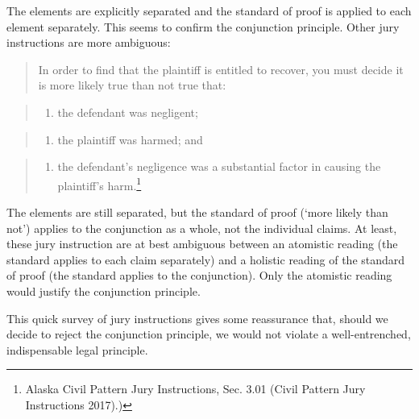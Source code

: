 \documentclass[
  10pt,
  dvipsnames,enabledeprecatedfontcommands]{scrartcl}
\providecommand{\tightlist}{%
  \setlength{\itemsep}{0pt}\setlength{\parskip}{0pt}}
\begin{document}
\noindent The elements are explicitly separated and the standard of
proof is applied to each element separately. This seems to confirm the
conjunction principle. Other jury instructions are more ambiguous:

\begin{quote}
In order to find that the plaintiff is entitled to recover, you must
decide it is more likely true than not true that:
\end{quote}

\begin{quote}
\begin{enumerate}
\def\labelenumi{\arabic{enumi}.}
\tightlist
\item
  the defendant was negligent;
\end{enumerate}
\end{quote}

\begin{quote}
\begin{enumerate}
\def\labelenumi{\arabic{enumi}.}
\setcounter{enumi}{1}
\tightlist
\item
  the plaintiff was harmed; and
\end{enumerate}
\end{quote}

\begin{quote}
\begin{enumerate}
\def\labelenumi{\arabic{enumi}.}
\setcounter{enumi}{2}
\tightlist
\item
  the defendant's negligence was a substantial factor in causing the
  plaintiff's harm.\footnote{Alaska Civil Pattern Jury Instructions,
    Sec. 3.01 (Civil Pattern Jury Instructions 2017).)}
\end{enumerate}
\end{quote}

\noindent The elements are still separated, but the standard of proof
(`more likely than not') applies to the conjunction as a whole, not the
individual claims. At least, these jury instruction are at best
ambiguous between an atomistic reading (the standard applies to each
claim separately) and a holistic reading of the standard of proof (the
standard applies to the conjunction). Only the atomistic reading would
justify the conjunction principle.

This quick survey of jury instructions gives some reassurance that,
should we decide to reject the conjunction principle, we would not
violate a well-entrenched, indispensable legal
principle.
\end{document}
